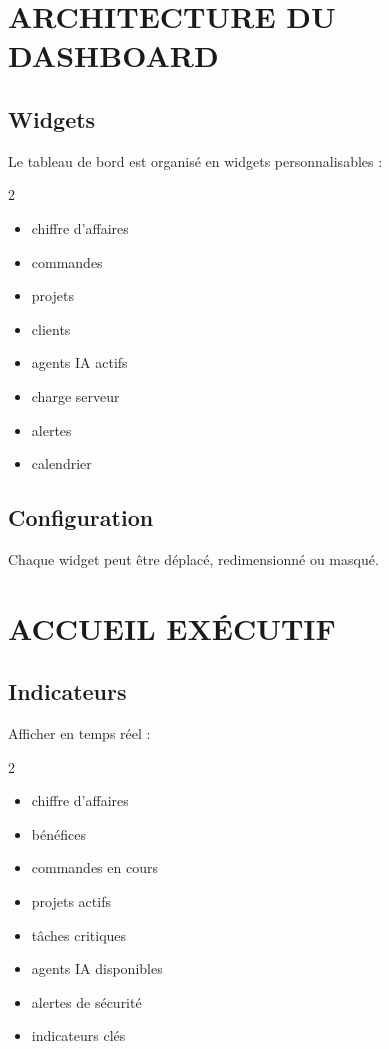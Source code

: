 \documentclass[12pt,a4paper,oneside]{book}
\begin{document}
\chapter{ARCHITECTURE DU DASHBOARD}

\section{Widgets}
Le tableau de bord est organisé en widgets personnalisables :
\begin{multicols}{2}
\begin{itemize}
\item chiffre d'affaires
\item commandes
\item projets
\item clients
\item agents IA actifs
\item charge serveur
\item alertes
\item calendrier
\end{itemize}
\end{multicols}

\section{Configuration}
Chaque widget peut être déplacé, redimensionné ou masqué.

\chapter{ACCUEIL EXÉCUTIF}

\section{Indicateurs}
Afficher en temps réel :
\begin{multicols}{2}
\begin{itemize}
\item chiffre d'affaires
\item bénéfices
\item commandes en cours
\item projets actifs
\item tâches critiques
\item agents IA disponibles
\item alertes de sécurité
\item indicateurs clés
\end{itemize}
\end{multicols}
\end{document}
